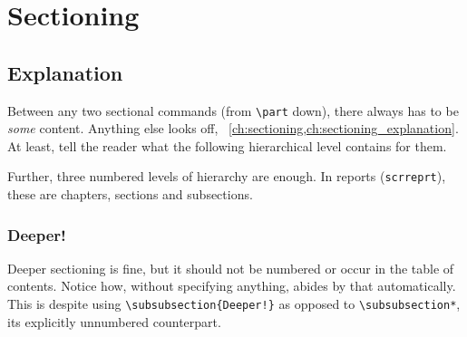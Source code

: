 \begin{landscape}
\begin{table}
{		%
	}%
\end{table}%
\end{landscape}

\section{Sectioning}\label{ch:sectioning}
\subsection{Explanation}\label{ch:sectioning_explanation}
Between any two sectional commands (from \verb|\part| down), there always has to be \emph{some} content.
Anything else looks off, \ \cref{ch:sectioning,ch:sectioning_explanation}.
At least, tell the reader what the following hierarchical level contains for them.

Further, three numbered levels of hierarchy are enough.
In  reports (\verb|scrreprt|), these are chapters, sections and subsections.

\subsubsection{Deeper!}
Deeper sectioning is fine, but it should not be numbered or occur in the table of contents.
Notice how, without specifying anything,  abides by that automatically.
This is despite using \verb|\subsubsection{Deeper!}| as opposed to \verb|\subsubsection*|, its explicitly unnumbered counterpart.

